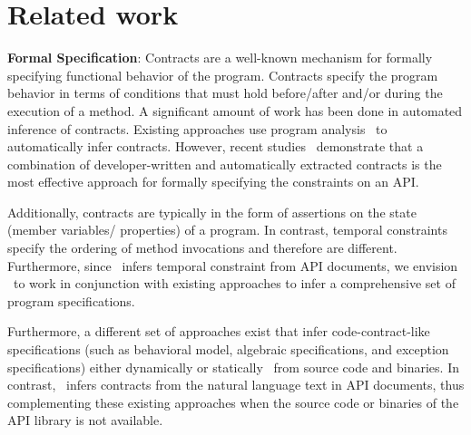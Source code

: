 \section{Related work}
\label{sec:related}



\textbf{Formal Specification}:
Contracts are a well-known mechanism for formally specifying functional behavior of the program. 
Contracts specify the program behavior in terms of conditions that must hold before/after and/or during the execution of a method.
A significant amount of work has been done in automated inference of contracts.
Existing approaches use program analysis~\cite{csallner08dysy,NimmerE02:ISSTA,Tillmann:2006:DLM:2105385.2105433}
to automatically infer contracts.
However, recent studies~\cite{Polikarpova2009ISSTA,Flanagan2001:HAA} demonstrate that a combination of developer-written and automatically extracted
contracts is the most effective approach for formally specifying the constraints on an API.

Additionally, contracts are typically in the form of assertions on the state (member variables/ properties) of a program. In contrast, temporal constraints specify the ordering of method invocations and therefore are different.
Furthermore, since \tool\ infers temporal constraint from API documents, we envision \tool\ to work in conjunction with existing approaches
to infer a comprehensive set of program specifications.
 
Furthermore, a different set of approaches exist that infer code-contract-like specifications (such as behavioral model, algebraic specifications, and exception specifications) either dynamically\cite{Henkel07discoveringdocumentation,Ghezzi:2009:SIB:1555001.1555057,Henkel:2008:DDA:1363102.1363105} or statically~\cite{Flanagan2001:HAA,Buse:2008:ADI:1390630.1390664} from source code and binaries. In contrast, \tool\ infers contracts from the natural language text in API documents,
thus complementing these existing approaches when the source code or binaries of the API library is not available.


